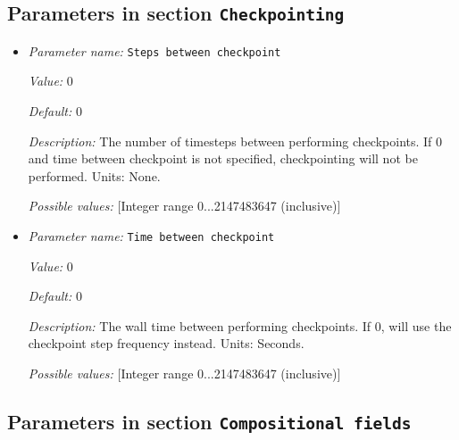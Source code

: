 \subsection{Parameters in section \tt Checkpointing}
\label{parameters:Checkpointing}

\begin{itemize}
\item {\it Parameter name:} {\tt Steps between checkpoint}
\label{parameters:Checkpointing/Steps between checkpoint}


{\it Value:} 0


{\it Default:} 0


{\it Description:} The number of timesteps between performing checkpoints. If 0 and time between checkpoint is not specified, checkpointing will not be performed. Units: None.


{\it Possible values:} [Integer range 0...2147483647 (inclusive)]
\item {\it Parameter name:} {\tt Time between checkpoint}
\label{parameters:Checkpointing/Time between checkpoint}


{\it Value:} 0


{\it Default:} 0


{\it Description:} The wall time between performing checkpoints. If 0, will use the checkpoint step frequency instead. Units: Seconds.


{\it Possible values:} [Integer range 0...2147483647 (inclusive)]
\end{itemize}

\subsection{Parameters in section \tt Compositional fields}
\label{parameters:Compositional_20fields}

